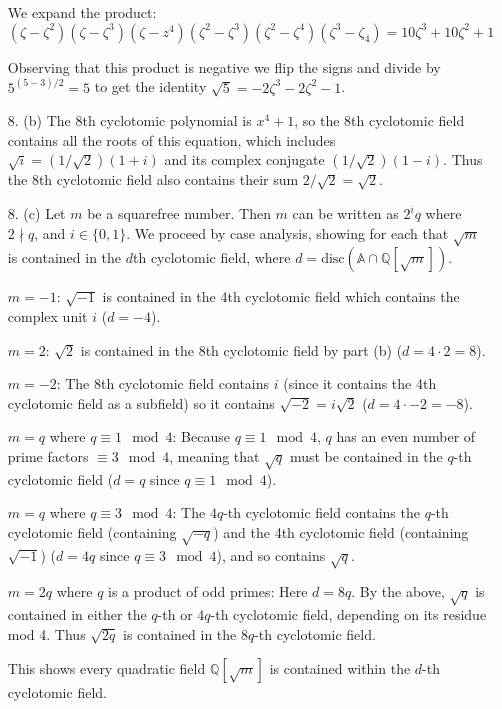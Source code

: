 \documentclass{article}
\newcommand{\z}[0]{\zeta}
\begin{document}
\begin{enumerate}
We expand the product: \[ (\z - \z^2)(\z - \z^3)(\z - z^4)(\z^2 - \z^3)(\z^2 - \z^4)(\z^3 - \z_4) = 10\z^3 + 10\z^2 + 1 \]

Observing that this product is negative we flip the signs and divide by $5^{(5 - 3)/2} = 5$ to get the identity $\sqrt{5} = -2\z^3 - 2\z^2 - 1$.

\item[8. (b)] The 8th cyclotomic polynomial is $x^4 + 1$, so the 8th cyclotomic field contains all the roots of this equation, which includes $\sqrt{i} = (1/\sqrt{2})(1 + i)$ and its complex conjugate $(1/\sqrt{2})(1 - i)$.  Thus the 8th cyclotomic field also contains their sum $2 / \sqrt{2} = \sqrt{2}$.

\item[8. (c)] Let $m$ be a squarefree number.  Then $m$ can be written as $2^{i} q$ where $2 \nmid q$, and $i \in \{0, 1\}$.  We proceed by case analysis, showing for each that $\sqrt{m}$ is contained in the $d$th cyclotomic field, where $d = \text{disc}(\mathbb{A} \cap \mathbb{Q}[\sqrt{m}])$.

$m = -1$: $\sqrt{-1}$ is contained in the 4th cyclotomic field which contains the complex unit $i$ ($d = -4$).

$m = 2$: $\sqrt{2}$ is contained in the 8th cyclotomic field by part (b) ($d = 4\cdot 2 = 8$).

$m = -2$: The 8th cyclotomic field contains $i$ (since it contains the 4th cyclotomic field as a subfield) so it contains $\sqrt{-2} = i\sqrt{2}$ ($d = 4\cdot -2 = -8$).

$m = q$ where $q \equiv 1 \mod 4$: Because $q \equiv 1 \mod 4$, $q$ has an even number of prime factors $\equiv 3 \mod 4$, meaning that $\sqrt{q}$ must be contained in the $q$-th cyclotomic field ($d = q$ since $q\equiv 1\mod 4$).

$m = q$ where $q \equiv 3 \mod 4$: The $4q$-th cyclotomic field contains the $q$-th cyclotomic field (containing $\sqrt{-q}$) and the 4th cyclotomic field (containing $\sqrt{-1}$) ($d = 4q$ since $q \equiv 3 \mod 4$), and so contains $\sqrt{q}$.

$m = 2q$ where $q$ is a product of odd primes:  Here $d = 8q$.  By the above, $\sqrt{q}$ is contained in either the $q$-th or $4q$-th cyclotomic field, depending on its residue mod 4.  Thus $\sqrt{2q}$ is contained in the $8q$-th cyclotomic field.

This shows every quadratic field $\mathbb{Q}[\sqrt{m}]$ is contained within the $d$-th cyclotomic field.


\end{enumerate}
\end{document}
